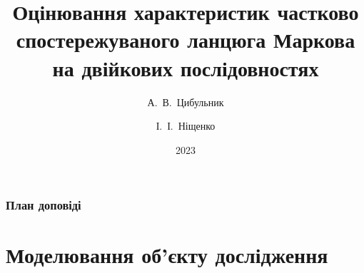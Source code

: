 \documentclass[12pt,mathserif]{beamer}
\title[Оцінювання характеристик ланцюга Маркова]{Оцінювання характеристик частково спостережуваного ланцюга Маркова на двійкових послідовностях}
\author[Цибульник, Ніщенко]{А.~В.~Цибульник \and І.~І.~Ніщенко}
\institute[Науково-практична конференція студентів]{Всеукраїнська науково-практична конференція студентів, аспірантів та молодих вчених}
\date{2023}
\theoremstyle{plain}
\begin{document}
\begin{frame}
    \titlepage
\end{frame}

\begin{frame}
    \frametitle{План доповіді}
    \tableofcontents
\end{frame}


\section{Моделювання об'єкту дослідження}
\end{document}

